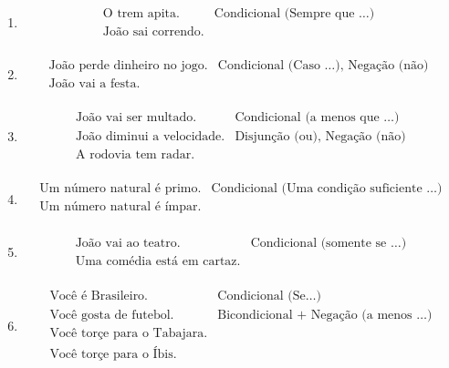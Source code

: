 \begin{enumerate}
\begin{enumerate}
				 \item
   				 \[\begin{array}{ll}    
  				 \text{O trem apita.} & \text{Condicional (Sempre que \ldots) } \\
  				 \text{Jo\~ao sai correndo.} & \\
  				 \end{array}
  				 \]
				 
				 \item
    			 \[\begin{array}{ll}    
   				 \text{Jo\~ao perde dinheiro no jogo.} & \text{Condicional (Caso \ldots), Nega\c{c}\~ao (n\~ao) } \\
   				 \text{Jo\~ao vai a festa.} & \\
   				 \end{array}
   				 \]
				  
				 \item
     			 \[\begin{array}{ll}    
  				 \text{Jo\~ao vai ser multado.} & \text{Condicional (a menos que \ldots) }  \\
  				 \text{Jo\~ao diminui a velocidade.} & \text{Disjun\c{c}\~ao (ou), Nega\c{c}\~ao (n\~ao)} \\
  				 \text{A rodovia tem radar.} & \\
  				 \end{array}
  				 \]
				 				  
				\item
   			    \[\begin{array}{ll}    
				\text{Um n\'umero natural \'e primo.} & \text{Condicional (Uma condi\c{c}\~ao suficiente \ldots)} \\
				\text{Um n\'umero natural \'e \'impar.} & \\
				\end{array}
				\]
				 
				\item
			    \[\begin{array}{ll}    
				\text{Jo\~ao vai ao teatro.} & \text{Condicional (somente se \ldots)} \\
				\text{Uma com\'edia est\'a em cartaz.} & \\
				\end{array}
				\]
				  
				\item
			    \[\begin{array}{ll}    
				\text{Voc\^e \'e Brasileiro.} & \text{Condicional   (Se\ldots)} \\
				\text{Voc\^e gosta de futebol.} & \text{Bicondicional + Nega\c{c}\~ao (a menos \ldots)} \\
				\text{Voc\^e tor\c{c}e para o Tabajara.} & \\
				\text{Voc\^e tor\c{c}e para o \'Ibis.} & \\
				\end{array}
				\]  
				

\end{enumerate}
\end{enumerate}
